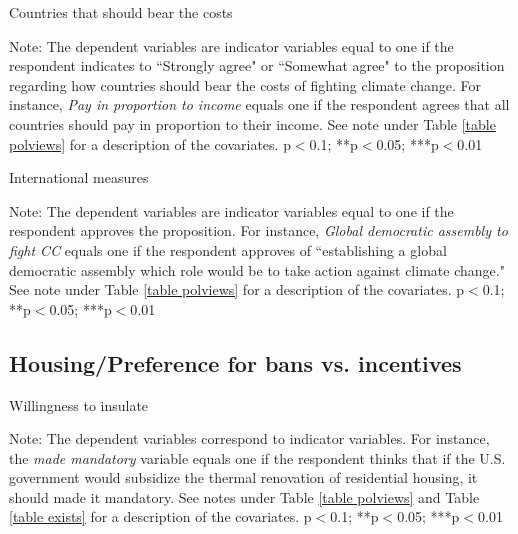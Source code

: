 \documentclass{article}
\begin{document}
\begin{landscape}
	\begin{table}[h!]
	\caption{Countries that should bear the costs}
	\begin{center}
		\scalebox{0.6}{}
	\end{center}
	{\footnotesize Note: The dependent variables are indicator variables equal to one if the respondent indicates to ``Strongly agree" or ``Somewhat agree" to the proposition regarding how countries should bear the costs of fighting climate change. For instance, \textit{Pay in proportion to income} equals one if the respondent agrees that all countries should pay in proportion to their income. See note under Table \ref{table polviews} for a description of the covariates.
	\newline *p$<$0.1; **p$<$0.05; ***p$<$0.01}
\end{table}	
\end{landscape}

\begin{landscape}
	\begin{table}[h!]
	\caption{International measures}
	\begin{center}
		\scalebox{0.6}{}
	\end{center}
	{\footnotesize Note: The dependent variables are indicator variables equal to one if the respondent approves the proposition. For instance, \textit{Global democratic assembly to fight CC} equals one if the respondent approves of ``establishing a global democratic assembly which role would be to take action against climate change." See note under Table \ref{table polviews} for a description of the covariates.
	\newline *p$<$0.1; **p$<$0.05; ***p$<$0.01}
\end{table}	
\end{landscape}



\clearpage
\subsection{Housing/Preference for bans vs. incentives}



\begin{table}[h!]
	\caption{Willingness to insulate}
	\begin{center}
		\scalebox{0.7}{}
	\end{center}
	{\footnotesize Note: The dependent variables correspond to indicator variables. For instance, the \textit{made mandatory} variable equals one if the respondent thinks that if the U.S. government would subsidize the thermal renovation of residential housing, it should made it mandatory. See notes under Table \ref{table polviews} and Table \ref{table exists} for a description of the covariates.
	\newline *p$<$0.1; **p$<$0.05; ***p$<$0.01}
\end{table}	
\end{document}

